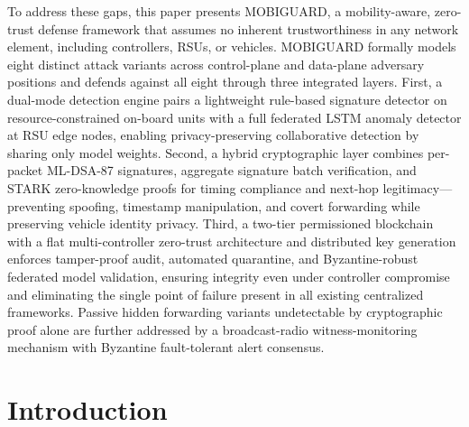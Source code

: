 \documentclass[12pt, a4paper]{report}
\begin{document}
To address these gaps, this paper presents MOBIGUARD, a mobility-aware,
zero-trust defense framework that assumes no inherent trustworthiness in
any network element, including controllers, RSUs, or vehicles. MOBIGUARD
formally models eight distinct attack variants across control-plane and
data-plane adversary positions and defends against all eight through three
integrated layers. First, a dual-mode detection engine pairs a lightweight
rule-based signature detector on resource-constrained on-board units with
a full federated LSTM anomaly detector at RSU edge nodes, enabling
privacy-preserving collaborative detection by sharing only model weights.
Second, a hybrid cryptographic layer combines per-packet ML-DSA-87 signatures,
aggregate signature batch verification, and
\ac{STARK} zero-knowledge proofs for timing
compliance and next-hop legitimacy---preventing
spoofing, timestamp manipulation, and covert
forwarding while preserving vehicle identity privacy.
Third, a two-tier permissioned blockchain with a flat
multi-controller zero-trust architecture and
distributed key generation enforces tamper-proof
audit, automated quarantine, and Byzantine-robust
federated model validation, ensuring integrity even
under controller compromise and eliminating the
single point of failure present in all existing
centralized frameworks. Passive hidden forwarding
variants undetectable by cryptographic proof alone
are further addressed by a broadcast-radio
witness-monitoring mechanism with Byzantine
fault-tolerant alert consensus.




\tableofcontents
\newpage

\listoffigures
\newpage

\listoftables
\newpage

\acuseall %
\printacronyms
\newpage

\renewcommand{\thepage}{\arabic{page}} %
\setcounter{page}{1} %

\chapter{Introduction}
\end{document}
